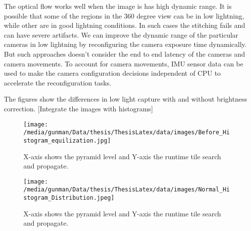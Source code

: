 The optical flow works well when the image is has high dynamic range. It is possible that some of the regions in the 360 degree view can be in low lightning, while other are in good lightning conditions. In such cases the stitching fails and can have severe artifacts. We can improve the dynamic range of the particular cameras in low lightning by reconfiguring the camera exposure time dynamically. But such approaches doesn't consider the end to end latency of the cameras and camera movements. To account for camera movements, IMU sensor data can be used to make the camera configuration decisions independent of CPU to accelerate the reconfiguration tasks. 

The figures show the differences in low light capture with and without brightness correction.
[Integrate the images with histograms]\newline
	\begin{figure}[h]
	\begin{center}
		\texttt{[image: /media/gunman/Data/thesis/ThesisLatex/data/images/Before\_Histogram\_equilization.jpg]}
		\caption{X-axis shows the pyramid level and Y-axis the runtime tile search and propagate.}
		\label{fig:ex_4_9}
	\end{center}
	\vspace{-0.3in}
\end{figure} 

\begin{figure}[h]
	\begin{center}
		\texttt{[image: /media/gunman/Data/thesis/ThesisLatex/data/images/Normal\_Histogram\_Distribution.jpeg]}
		\caption{X-axis shows the pyramid level and Y-axis the runtime tile search and propagate.}
		\label{fig:ex_4_9}
	\end{center}
	\vspace{-0.3in}
\end{figure} 



